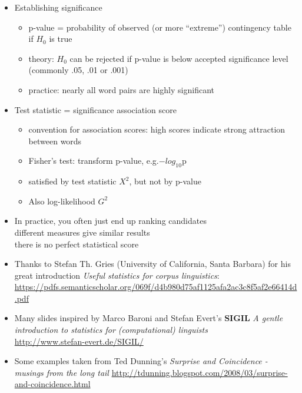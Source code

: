 \documentclass[a4paper,landscape,headrule,footrule,xetex]{foils}
\begin{document}
\begin{itemize}
\item Establishing significance
  \begin{itemize}
  \item p-value = probability of observed (or more “extreme”)
contingency table if $H_0$ is true
\item theory: $H_0$ can be rejected if p-value is below accepted
significance level (commonly .05, .01 or .001)
\item practice: nearly all word pairs are highly significant
\end{itemize}
\newpage
\item Test statistic = significance association score
\begin{itemize}
\item convention for association scores: high scores indicate
strong attraction between words
\item Fisher's test: transform p-value, e.g.$-log_{10}$p
\item satisfied by test statistic $X^2$, but not by p-value
\item Also log-likelihood $G^2$
\end{itemize}
\item In practice, you often just end up ranking candidates
  \\ different measures give similar results
  \\ there is no perfect statistical score
\end{itemize}



 \begin{itemize}
 \item Thanks to Stefan Th. Gries (University of California, Santa
   Barbara) for his great introduction \textit{Useful statistics for
     corpus linguistics}:
\url{https://pdfs.semanticscholar.org/069f/d4b980d75af1125afa2ac3c8f5af2e66414d.pdf}

 \item Many slides inspired by Marco Baroni and Stefan Evert's
   \textbf{SIGIL} \textit{A gentle introduction to statistics for
   (computational) linguists}
 \\ \url{http://www.stefan-evert.de/SIGIL/} 
 \item Some examples taken from Ted Dunning's \textit{Surprise and
     Coincidence - musings from the long tail}
   \url{http://tdunning.blogspot.com/2008/03/surprise-and-coincidence.html}
 \end{itemize}
\end{document}
